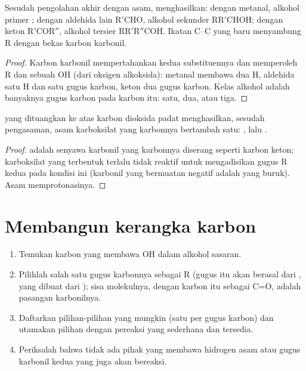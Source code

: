 \begin{proposition}\label{prop:b1:organomagnesium:carbonyl-addition}
Sesudah pengolahan akhir dengan asam,  
menghasilkan: dengan metanal, alkohol primer ; dengan aldehida
lain $\mathrm{R'CHO}$, alkohol sekunder $\mathrm{RR'CHOH}$; dengan keton
$\mathrm{R'COR''}$, alkohol tersier $\mathrm{RR'R''COH}$. Ikatan C--C
yang baru menyambung R dengan bekas karbon karbonil.
\end{proposition}

\begin{proof}
Karbon karbonil mempertahankan kedua substituennya dan memperoleh R dan
sebuah OH (dari oksigen alkoksida): metanal membawa dua H, aldehida satu
H dan satu gugus karbon, keton dua gugus karbon. Kelas alkohol adalah
banyaknya gugus karbon pada karbon itu: satu, dua, atau tiga.
\end{proof}

\begin{proposition}\label{prop:b1:organomagnesium:co2}
 yang dituangkan ke atas karbon dioksida padat
menghasilkan, sesudah pengasaman, asam karboksilat  yang
karbonnya bertambah satu: , lalu
.
\end{proposition}

\begin{proof}
 adalah senyawa karbonil yang karbonnya diserang seperti karbon
keton; karboksilat yang terbentuk terlalu tidak reaktif untuk
mengadisikan gugus R kedua pada kondisi ini (karbonil yang bermuatan
negatif adalah  yang buruk). Asam memprotonasinya.
\end{proof}

\section{Membangun kerangka karbon}

\begin{method}\label{met:b1:organomagnesium:plan-alcohol}
\begin{enumerate}
  \item Temukan karbon yang membawa OH dalam alkohol sasaran.
  \item Pilihlah salah satu gugus karbonnya sebagai R (gugus itu akan
        berasal dari , yang dibuat dari );
        sisa molekulnya, dengan karbon itu sebagai C=O, adalah pasangan
        karbonilnya.
  \item Daftarkan pilihan-pilihan yang mungkin (satu per gugus karbon)
        dan utamakan pilihan dengan pereaksi yang sederhana dan tersedia.
  \item Periksalah bahwa tidak ada pihak yang membawa hidrogen asam atau
        gugus karbonil kedua yang juga akan bereaksi.
\end{enumerate}
\end{method}

